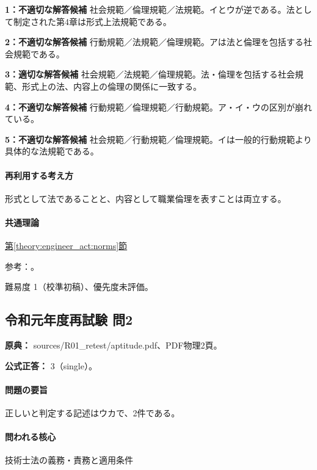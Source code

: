 \noindent\textbf{1：不適切な解答候補} 社会規範／倫理規範／法規範。イとウが逆である。法として制定された第4章は形式上法規範である。\par

\noindent\textbf{2：不適切な解答候補} 行動規範／法規範／倫理規範。アは法と倫理を包括する社会規範である。\par

\noindent\textbf{3：適切な解答候補} 社会規範／法規範／倫理規範。法・倫理を包括する社会規範、形式上の法、内容上の倫理の関係に一致する。\par

\noindent\textbf{4：不適切な解答候補} 行動規範／倫理規範／行動規範。ア・イ・ウの区別が崩れている。\par

\noindent\textbf{5：不適切な解答候補} 社会規範／行動規範／倫理規範。イは一般的行動規範より具体的な法規範である。\par

\paragraph{再利用する考え方} 形式として法であることと、内容として職業倫理を表すことは両立する。

\paragraph{共通理論} \hyperref[theory:engineer_act:norms]{第\ref*{theory:engineer_act:norms}節}

\par 参考：\cite{engineer_act_current}。

\par 難易度 1（校準初稿）、優先度未評価。

\subsection{令和元年度再試験 問2}
\label{q:r01-ret-apt-02}

\noindent\textbf{原典：} sources/R01\_retest/aptitude.pdf、PDF物理2頁。

\textbf{公式正答：} 3（single）。

\paragraph{問題の要旨} 正しいと判定する記述はウカで、2件である。

\paragraph{問われる核心} 技術士法の義務・責務と適用条件

